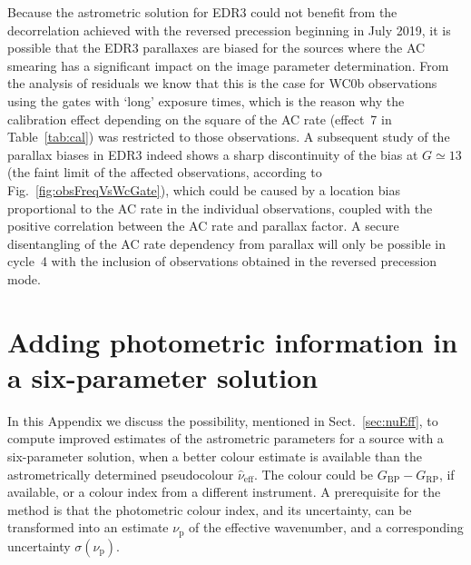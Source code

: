 \documentclass[longauth]{aa} %
\begin{document}
Because the astrometric solution for EDR3 could not benefit from the decorrelation
achieved with the reversed precession beginning in July 2019, it is possible that the
EDR3 parallaxes are biased for the sources where the AC smearing has a significant 
impact on the image parameter determination. From the analysis of residuals we know 
that this is the case for WC0b observations using the gates with `long' exposure times, 
which is the reason why the calibration effect depending on the square of the AC rate 
(effect~7 in Table~\ref{tab:cal}) was restricted to those observations. A subsequent 
study of the parallax biases in EDR3 \citep{EDR3-DPACP-132} indeed shows a sharp
discontinuity of the bias at $G\simeq 13$ (the faint limit of the affected observations,
according to Fig.~\ref{fig:obsFreqVsWcGate}), which could be caused by a location
bias proportional to the AC rate in the individual observations, coupled with the
positive correlation between the AC rate and parallax factor. A secure disentangling 
of the AC rate dependency from parallax will only be possible in cycle~4 with the
inclusion of observations obtained in the reversed precession mode.


\section{Adding photometric information in a six-parameter solution}
\label{sec:col6p}

In this Appendix we discuss the possibility, mentioned in Sect.~\ref{sec:nuEff},
to compute improved estimates of the astrometric parameters for a source
with a six-parameter solution, when a better colour estimate is available than the 
astrometrically determined pseudocolour $\hat{\nu}_\text{eff}$. The colour could 
be $G_\text{BP}-G_\text{RP}$, if available, or a colour index from a
different instrument. A prerequisite for the method is that the photometric
colour index, and its uncertainty, can be transformed into an estimate $\nu_\text{p}$
of the effective wavenumber, and a corresponding uncertainty $\sigma(\nu_\text{p})$.
\end{document}
